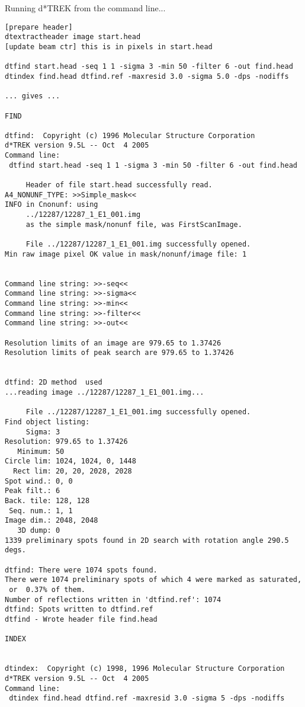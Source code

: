 \documentclass[a4paper, 11pt]{article}
\begin{document}
Running d*TREK from the command line...

{
\small
\begin{verbatim}
[prepare header]
dtextractheader image start.head
[update beam ctr] this is in pixels in start.head

dtfind start.head -seq 1 1 -sigma 3 -min 50 -filter 6 -out find.head
dtindex find.head dtfind.ref -maxresid 3.0 -sigma 5.0 -dps -nodiffs

... gives ...

FIND

dtfind:  Copyright (c) 1996 Molecular Structure Corporation
d*TREK version 9.5L -- Oct  4 2005
Command line:
 dtfind start.head -seq 1 1 -sigma 3 -min 50 -filter 6 -out find.head

     Header of file start.head successfully read.
A4_NONUNF_TYPE: >>Simple_mask<<
INFO in Cnonunf: using
     ../12287/12287_1_E1_001.img
     as the simple mask/nonunf file, was FirstScanImage.

     File ../12287/12287_1_E1_001.img successfully opened.
Min raw image pixel OK value in mask/nonunf/image file: 1


Command line string: >>-seq<<
Command line string: >>-sigma<<
Command line string: >>-min<<
Command line string: >>-filter<<
Command line string: >>-out<<

Resolution limits of an image are 979.65 to 1.37426
Resolution limits of peak search are 979.65 to 1.37426


dtfind: 2D method  used
...reading image ../12287/12287_1_E1_001.img...

     File ../12287/12287_1_E1_001.img successfully opened.
Find object listing:
     Sigma: 3
Resolution: 979.65 to 1.37426
   Minimum: 50
Circle lim: 1024, 1024, 0, 1448
  Rect lim: 20, 20, 2028, 2028
Spot wind.: 0, 0
Peak filt.: 6
Back. tile: 128, 128
 Seq. num.: 1, 1
Image dim.: 2048, 2048
   3D dump: 0
1339 preliminary spots found in 2D search with rotation angle 290.5 degs.

dtfind: There were 1074 spots found.
There were 1074 preliminary spots of which 4 were marked as saturated,
 or  0.37% of them.
Number of reflections written in 'dtfind.ref': 1074
dtfind: Spots written to dtfind.ref
dtfind - Wrote header file find.head

INDEX


dtindex:  Copyright (c) 1998, 1996 Molecular Structure Corporation
d*TREK version 9.5L -- Oct  4 2005
Command line:
 dtindex find.head dtfind.ref -maxresid 3.0 -sigma 5 -dps -nodiffs


\end{verbatim}}
\end{document}

